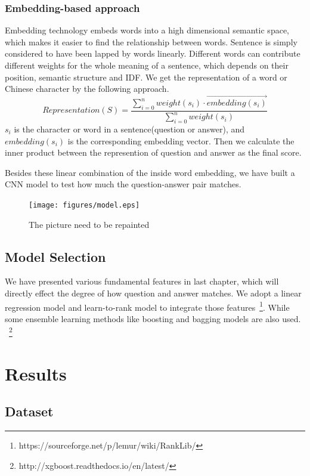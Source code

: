 \documentclass{llncs}
\begin{document}
\subsubsection{Embedding-based approach}
\label{sec:embedding}
Embedding technology embeds words into a high dimensional semantic space, which makes it easier to find the relationship between words. Sentence is simply considered to have been lapped by words linearly. Different words can contribute different weights for the whole meaning of a sentence, which depends on their position, semantic structure and IDF.
We get the representation of a word or Chinese character by the following approach.
\begin{equation}
Representation(S) = \frac{\sum_{i=0}^n weight(s_i)\cdot \overrightarrow { embedding(s_i)} }{\sum_{i=0}^n weight(s_i) }
\label{eq:representation}
\end{equation}
$s_i$ is the character or word in a sentence(question or answer), and $embedding(s_i)$ is the corresponding embedding vector. Then we calculate the inner product between the represention of question and answer as the final score.

Besides these linear combination of the inside word embedding, we have {\color{red}built} a CNN model to test how much the question-answer pair matches.
\begin{figure}
\centering
\texttt{[image: figures/model.eps]}
\caption{ The picture need to be repainted}
\label{fig:model}
\end{figure}



\subsection{Model Selection}
\label{sec:model}
We have presented various fundamental features in last chapter, which will directly effect the degree of how question and answer matches. We adopt a linear regression model and learn-to-rank model \cite{Liu2009Learning} to integrate those features~\footnote{https://sourceforge.net/p/lemur/wiki/RankLib/}. While some ensemble learning methods like boosting and bagging models are also used.~\cite{Chen2016XGBoost} ~\footnote{http://xgboost.readthedocs.io/en/latest/}


\section{Results}
\label{sec:results}

\subsection{Dataset}
\end{document}
